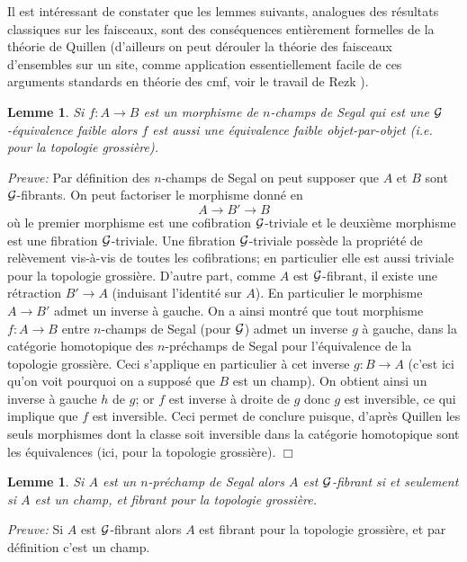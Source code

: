 \documentclass[12pt]{article}
\newcommand{\eop}{\hfill $\Box$\vspace{.1in}}
\newtheorem{lemme}[lemma]{Lemme}
\newcommand{\Gg}{{\cal G}}
\begin{document}
Il est int\'eressant de constater que les lemmes suivants, analogues des
r\'esultats classiques sur les faisceaux, sont des cons\'equences enti\`erement
formelles de la th\'eorie de Quillen \cite{Quillen}
(d'ailleurs on peut
d\'erouler la th\'eorie des faisceaux d'ensembles sur un site, comme application
essentiellement facile de ces arguments standards en th\'eorie des
cmf, voir le travail de Rezk \cite{Rezk}).

\begin{lemme}
\label{morphentrechamps}
Si $f:A\rightarrow B$ est un morphisme de $n$-champs de Segal qui est une
$\Gg$-\'equivalence faible alors $f$ est aussi une \'equivalence faible
objet-par-objet (i.e. pour la topologie grossi\`ere).
\end{lemme}
{\em Preuve:}
Par d\'efinition des $n$-champs de Segal on peut supposer que $A$ et $B$ sont
$\Gg$-fibrants. On peut factoriser le morphisme donn\'e en
$$
A\rightarrow B' \rightarrow B
$$
o\`u le premier morphisme est une cofibration $\Gg$-triviale et le deuxi\`eme
morphisme est une fibration $\Gg$-triviale. Une fibration $\Gg$-triviale
poss\`ede la propri\'et\'e de rel\`evement vis-\`a-vis de toutes les
cofibrations; en
particulier elle est aussi triviale pour la topologie grossi\`ere. D'autre part,
comme $A$ est $\Gg$-fibrant, il existe une r\'etraction $B'\rightarrow A$
(induisant l'identit\'e sur $A$). En particulier le morphisme $A\rightarrow B'$
admet un inverse \`a gauche. On a ainsi montr\'e que tout morphisme
$f:A\rightarrow B$
entre $n$-champs de Segal (pour $\Gg$) admet un inverse $g$ \`a gauche,
dans la
cat\'egorie homotopique des $n$-pr\'echamps de Segal pour l'\'equivalence de la
topologie grossi\`ere. Ceci s'applique en
particulier \`a cet inverse $g:B\rightarrow A$ (c'est ici
qu'on voit pourquoi on a suppos\'e que $B$ est un
champ). On obtient ainsi un inverse \`a gauche $h$ de $g$; or $f$ est inverse
\`a droite de $g$ donc $g$ est inversible, ce qui implique que $f$ est
inversible. Ceci permet de conclure puisque, d'apr\`es Quillen
\cite{Quillen} les seuls morphismes
dont la classe soit inversible dans la cat\'egorie homotopique
sont les
\'equivalences (ici, pour la topologie grossi\`ere).
\eop

\begin{lemme}
\label{grofibchampimplfib}
Si $A$ est un $n$-pr\'echamp de Segal alors $A$ est $\Gg$-fibrant si et
seulement
si $A$ est un champ, et fibrant pour la topologie grossi\`ere.
\end{lemme}
{\em Preuve:}
Si $A$ est $\Gg$-fibrant alors $A$ est
fibrant pour la topologie grossi\`ere, et par d\'efinition c'est un champ.
\end{document}
